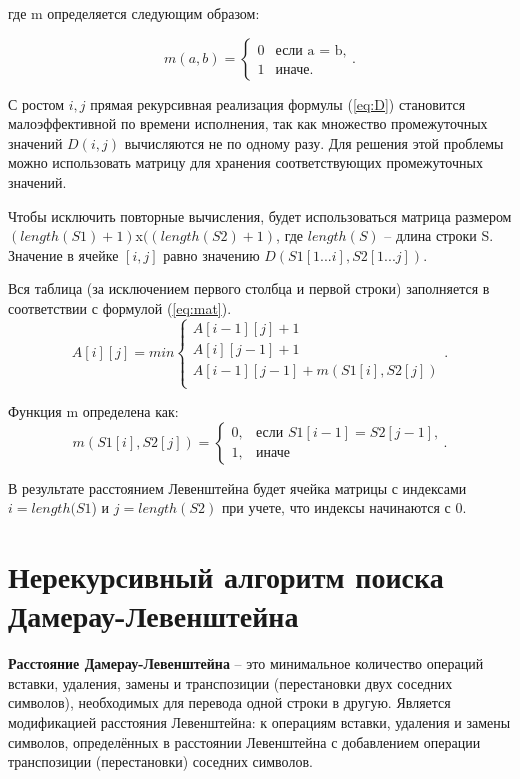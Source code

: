где m определяется следующим образом:

\begin{equation}
	\label{eq:m}
	m(a, b) = \begin{cases}
		0 &\text{если a = b,}\\
		1 &\text{иначе.}
	\end{cases}.
\end{equation}

С ростом $i, j$ прямая рекурсивная реализация формулы (\ref{eq:D}) становится малоэффективной по времени исполнения, так как множество промежуточных значений $ D(i, j)$ вычисляются не по одному разу. Для решения этой проблемы можно использовать матрицу для хранения соответствующих промежуточных значений.

Чтобы исключить повторные вычисления, будет использоваться матрица размером $(length(S1)+ 1)$x$((length(S2) + 1)$, где $length(S)$ -- длина строки S. Значение в ячейке $[i, j]$ равно значению $D(S1[1...i], S2[1...j])$.

Вся таблица (за исключением первого столбца и первой строки) заполняется в соответствии с формулой (\ref{eq:mat}).
\begin{equation}
	\label{eq:mat}
	A[i][j] = min \begin{cases}
		A[i-1][j] + 1\\
		 A[i][j-1] + 1\\
		 A[i-1][j-1] + m(S1[i], S2[j])\\
	 \end{cases}.
 \end{equation}

Функция m определена как:
\begin{equation}
\label{eq:m2}
m(S1[i], S2[j]) = \begin{cases}
0, &\text{если $S1[i - 1] = S2[j - 1]$,}\\
1, &\text{иначе}
\end{cases}.
\end{equation}
 
В результате расстоянием Левенштейна будет ячейка матрицы с индексами $i = length(S1$) и $j = length(S2)$ при учете, что индексы начинаются с 0.


\section{Нерекурсивный алгоритм поиска \\Дамерау-Левенштейна}

\textbf{Расстояние Дамерау-Левенштейна } -- это минимальное количество операций вставки, удаления, замены и транспозиции (перестановки двух соседних символов), необходимых для перевода одной строки в другую. Является модификацией расстояния Левенштейна: к операциям вставки, удаления и замены символов, определённых в расстоянии Левенштейна с добавлением операции транспозиции (перестановки) соседних символов.


